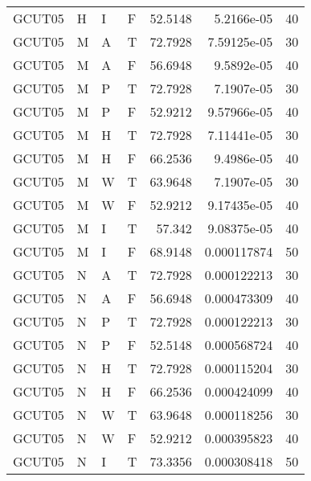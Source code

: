 \begin{longtable}{llllrrr}
    GCUT05   & H         & I         & F          & 52.5148    & 5.2166e-05  & 40       \\
    GCUT05   & M         & A         & T          & 72.7928    & 7.59125e-05 & 30       \\
    GCUT05   & M         & A         & F          & 56.6948    & 9.5892e-05  & 40       \\
    GCUT05   & M         & P         & T          & 72.7928    & 7.1907e-05  & 30       \\
    GCUT05   & M         & P         & F          & 52.9212    & 9.57966e-05 & 40       \\
    GCUT05   & M         & H         & T          & 72.7928    & 7.11441e-05 & 30       \\
    GCUT05   & M         & H         & F          & 66.2536    & 9.4986e-05  & 40       \\
    GCUT05   & M         & W         & T          & 63.9648    & 7.1907e-05  & 30       \\
    GCUT05   & M         & W         & F          & 52.9212    & 9.17435e-05 & 40       \\
    GCUT05   & M         & I         & T          & 57.342     & 9.08375e-05 & 40       \\
    GCUT05   & M         & I         & F          & 68.9148    & 0.000117874 & 50       \\
    GCUT05   & N         & A         & T          & 72.7928    & 0.000122213 & 30       \\
    GCUT05   & N         & A         & F          & 56.6948    & 0.000473309 & 40       \\
    GCUT05   & N         & P         & T          & 72.7928    & 0.000122213 & 30       \\
    GCUT05   & N         & P         & F          & 52.5148    & 0.000568724 & 40       \\
    GCUT05   & N         & H         & T          & 72.7928    & 0.000115204 & 30       \\
    GCUT05   & N         & H         & F          & 66.2536    & 0.000424099 & 40       \\
    GCUT05   & N         & W         & T          & 63.9648    & 0.000118256 & 30       \\
    GCUT05   & N         & W         & F          & 52.9212    & 0.000395823 & 40       \\
    GCUT05   & N         & I         & T          & 73.3356    & 0.000308418 & 50       \\

\end{longtable}
